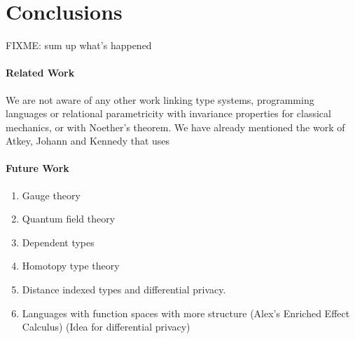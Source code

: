 \documentclass[preprint]{sigplanconf}
\theoremstyle{examplestyle}
\begin{document}
\section{Conclusions}
\label{sec:conclusions}

FIXME: sum up what's happened

\paragraph{Related Work} We are not aware of any other work linking
type systems, programming languages or relational parametricity with
invariance properties for classical mechanics, or with Noether's
theorem. We have already mentioned the work of Atkey, Johann and
Kennedy \cite{atkey13abstraction} that uses 

\paragraph{Future Work}

\begin{enumerate}
\item Gauge theory
\item Quantum field theory
\item Dependent types
\item Homotopy type theory
\item Distance indexed types and differential privacy.
\item Languages with function spaces with more structure (Alex's
  Enriched Effect Calculus) (Idea for differential privacy)
\end{enumerate}
\end{document}
